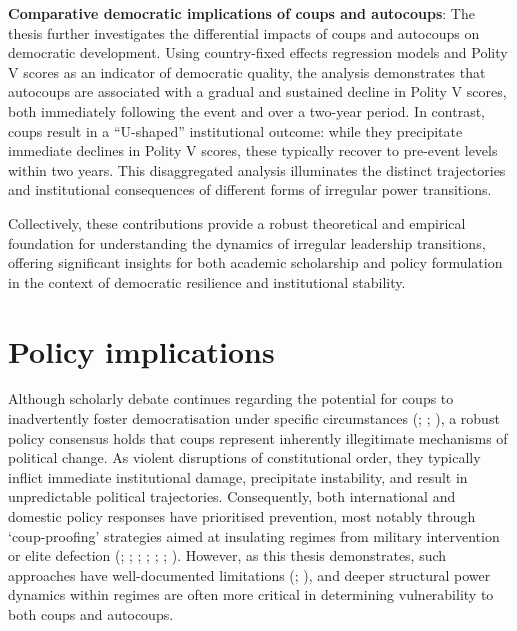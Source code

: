\documentclass[
  12pt,
]{report}
\begin{document}
\textbf{Comparative democratic implications of coups and autocoups}: The
thesis further investigates the differential impacts of coups and
autocoups on democratic development. Using country-fixed effects
regression models and Polity V scores as an indicator of democratic
quality, the analysis demonstrates that autocoups are associated with a
gradual and sustained decline in Polity V scores, both immediately
following the event and over a two-year period. In contrast, coups
result in a ``U-shaped'' institutional outcome: while they precipitate
immediate declines in Polity V scores, these typically recover to
pre-event levels within two years. This disaggregated analysis
illuminates the distinct trajectories and institutional consequences of
different forms of irregular power transitions.

Collectively, these contributions provide a robust theoretical and
empirical foundation for understanding the dynamics of irregular
leadership transitions, offering significant insights for both academic
scholarship and policy formulation in the context of democratic
resilience and institutional stability.

\section{Policy implications}\label{policy-implications}

Although scholarly debate continues regarding the potential for coups to
inadvertently foster democratisation under specific circumstances
(;
;
), a robust policy consensus
holds that coups represent inherently illegitimate mechanisms of
political change. As violent disruptions of constitutional order, they
typically inflict immediate institutional damage, precipitate
instability, and result in unpredictable political trajectories.
Consequently, both international and domestic policy responses have
prioritised prevention, most notably through `coup-proofing' strategies
aimed at insulating regimes from military intervention or elite
defection (;
;
;
;
;
;
). However, as this thesis
demonstrates, such approaches have well-documented limitations
(;
), and deeper structural power
dynamics within regimes are often more critical in determining
vulnerability to both coups and autocoups.
\end{document}
